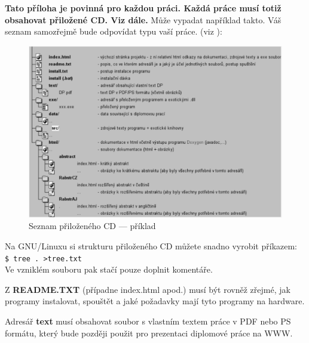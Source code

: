 \textbf{\large Tato příloha je povinná pro každou práci. Každá práce musí totiž obsahovat přiložené CD. Viz dále.}
Může vypadat například takto. Váš seznam samozřejmě bude odpovídat typu vaší práce. (viz \cite{infodp}):
\begin{figure}[h]
\begin{center}
\includegraphics[width=14cm]{figures/seznamcd}
\caption{Seznam přiloženého CD --- příklad}
\label{fig:seznamcd}
\end{center}
\end{figure}
Na GNU/Linuxu si strukturu přiloženého CD můžete snadno vyrobit příkazem:\\ 
\verb|$ tree . >tree.txt|\\
Ve vzniklém souboru pak stačí pouze doplnit komentáře.

Z \textbf{README.TXT} (případne index.html apod.)  musí být rovněž zřejmé, jak programy instalovat, spouštět a jaké požadavky mají tyto programy na hardware.

Adresář \textbf{text}  musí obsahovat soubor s vlastním textem práce v PDF nebo PS formátu, který bude později použit pro prezentaci diplomové práce na WWW.
